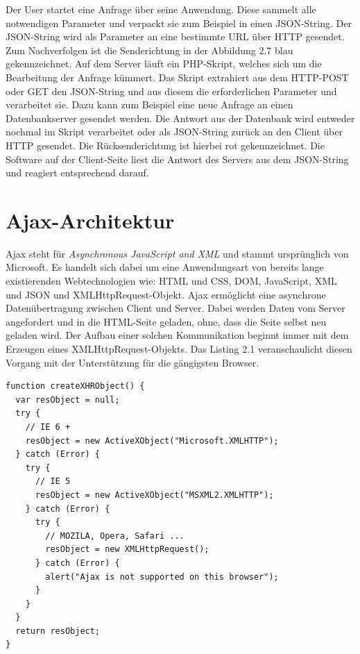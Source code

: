 Der User startet eine Anfrage \"uber seine Anwendung.
Diese sammelt alle notwendigen Parameter und verpackt sie zum Beispiel in einen JSON-String.
Der JSON-String wird als Parameter an eine bestimmte URL \"uber HTTP gesendet.
Zum Nachverfolgen ist die Senderichtung in der Abbildung 2.7 blau gekennzeichnet.
Auf dem Server l\"auft ein PHP-Skript, welches sich um die Bearbeitung der Anfrage k\"ummert.
Das Skript extrahiert aus dem HTTP-POST oder GET den JSON-String und aus diesem die erforderlichen Parameter und verarbeitet sie.
Dazu kann zum Beispiel eine neue Anfrage an einen Datenbankserver gesendet werden.
Die Antwort aus der Datenbank wird entweder nochmal im Skript verarbeitet oder als JSON-String 
zur\"uck an den Client \"uber HTTP gesendet.
Die R\"ucksenderichtung ist hierbei rot gekennzeichnet.
Die Software auf der Client-Seite liest die Antwort des Servers aus dem JSON-String und reagiert
entsprechend darauf.\\



\section{Ajax-Architektur}

Ajax steht f\"ur \emph{Asynchronous JavaScript and XML}\cite[Kapitel 18]{Ajax:02} und stammt urspr\"unglich von Microsoft.
Es handelt sich dabei um eine Anwendungsart von bereits lange existierenden Webtechnologien wie:
HTML und CSS, DOM, JavaScript, XML und JSON und XMLHttpRequest-Objekt.
Ajax erm\"oglicht eine asynchrone Daten\"ubertragung zwischen Client und Server. 
Dabei werden Daten vom Server angefordert und in die HTML-Seite geladen, ohne, dass die Seite selbst neu geladen wird.
Der Aufbau einer solchen Kommunikation beginnt immer mit dem Erzeugen eines XMLHttpRequest-Objekts.
Das Listing 2.1 veranschaulicht diesen Vorgang mit der Unterst\"utzung f\"ur die g\"angigsten Browser.\\

\begin{lstlisting}[caption={createXHRObject() Funktion in JavaScript}]
function createXHRObject() {    
  var resObject = null;            
  try {                
    // IE 6 +
    resObject = new ActiveXObject("Microsoft.XMLHTTP");
  } catch (Error) {                
    try {
      // IE 5
      resObject = new ActiveXObject("MSXML2.XMLHTTP");
    } catch (Error) {                    
      try {
        // MOZILA, Opera, Safari ...                    
        resObject = new XMLHttpRequest();
      } catch (Error) {                    
        alert("Ajax is not supported on this browser");
      }
    }  
  }
  return resObject;
}
\end{lstlisting}

